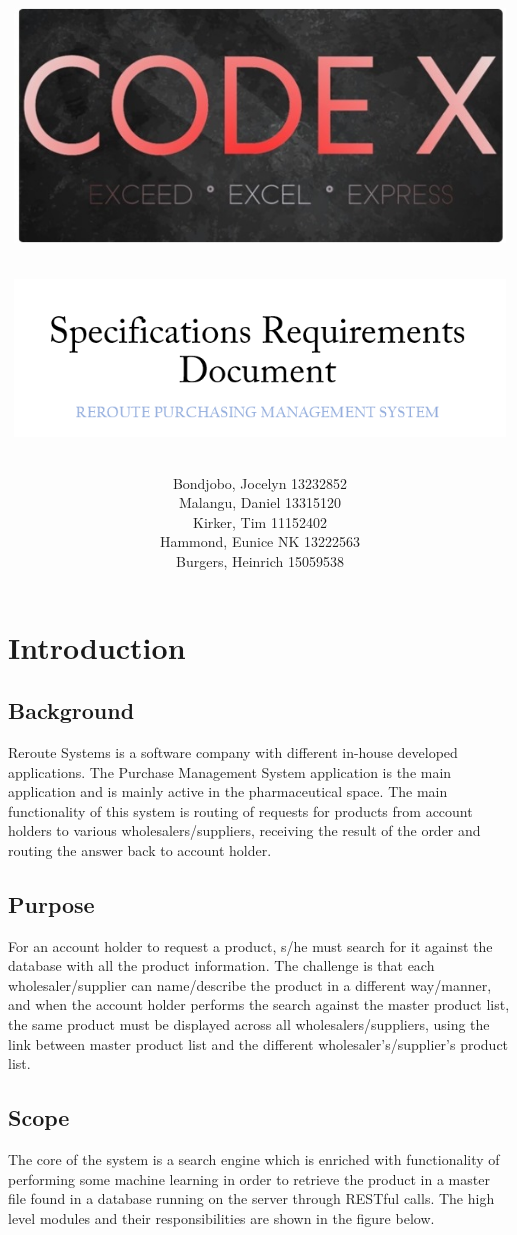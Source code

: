 \documentclass[a4paper,10pt]{article}
\title{\includegraphics[width=13cm]{CodeXBanner2rounded.jpg} \\
       \vspace{0.2cm}
       \begin{large}
       \includegraphics[width=13cm]{srs.jpg} \\
       \end{large}
       }
\date{}
\author{	Bondjobo, Jocelyn 		13232852 		\\
		Malangu, Daniel		13315120		\\
		Kirker, Tim			11152402		\\
		Hammond, Eunice	NK	13222563		\\
		Burgers, Heinrich		15059538		\\
}
\begin{document}
\maketitle
\thispagestyle{empty}
\clearpage

\newpage
{}
\thispagestyle{empty}
\tableofcontents
\clearpage

\newpage
{}

\section{Introduction}

	\subsection{Background} 
	Reroute Systems is a software company with different in-house developed applications. The Purchase Management System application is the main application and is mainly active in the pharmaceutical space. The main functionality of this system is routing of requests for products from account holders to various wholesalers/suppliers, receiving the result of the order and routing the answer back to account holder.
	
	\subsection{Purpose} 	
	For an account holder to request a product, s/he must search for it against the database with all the product information. The challenge is that each wholesaler/supplier can name/describe the product in a different way/manner, and when the account holder performs the search against the master product list, the same product must be displayed across all wholesalers/suppliers, using the link between master product list and the different wholesaler's/supplier's product list.
	
	\subsection{Scope} 
	The core of the system is a search engine which is enriched with functionality
of performing some machine learning in order to retrieve the product in a master file found in a database running on the server through RESTful calls. The high level modules and their responsibilities are shown in the figure below. \\ \\
\end{document}
